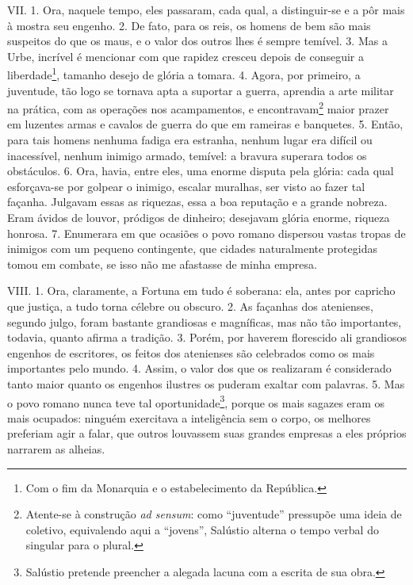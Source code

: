 VII. 1. Ora, naquele tempo, eles passaram, cada qual, a distinguir-se e a pôr
mais à mostra seu engenho. 2. De fato, para os reis, os homens de bem são mais
suspeitos do que os maus, e o valor dos outros lhes é sempre temível. 3. Mas a
Urbe, incrível é mencionar com que rapidez cresceu depois de conseguir a
liberdade\footnote{Com o fim da Monarquia e o estabelecimento da República.},
tamanho desejo de glória a tomara. 4. Agora, por primeiro, a juventude, tão
logo se tornava apta a suportar a guerra, aprendia a arte militar na prática,
com as operações nos acampamentos, e encontravam\footnote{Atente-se à
construção \emph{ad sensum}: como ``juventude'' pressupõe uma ideia de
coletivo, equivalendo aqui a ``jovens'', Salústio alterna o tempo verbal do
singular para o plural.} maior prazer em luzentes armas e cavalos de guerra do
que em rameiras e banquetes. 5. Então, para tais homens nenhuma fadiga era
estranha, nenhum lugar era difícil ou inacessível, nenhum inimigo armado,
temível: a bravura superara todos os obstáculos. 6. Ora, havia, entre eles, uma
enorme disputa pela glória: cada qual esforçava-se por golpear o inimigo,
escalar muralhas, ser visto ao fazer tal façanha. Julgavam essas as riquezas,
essa a boa reputação e a grande nobreza. Eram ávidos de louvor, pródigos de
dinheiro; desejavam glória enorme, riqueza honrosa. 7. Enumerara em que
ocasiões o povo romano dispersou vastas tropas de inimigos com um pequeno
contingente, que cidades naturalmente protegidas tomou em combate, se isso não
me afastasse de minha empresa.

VIII. 1. Ora, claramente, a Fortuna em tudo é soberana: ela, antes por capricho
que justiça, a tudo torna célebre ou obscuro. 2. As façanhas dos atenienses,
segundo julgo, foram bastante grandiosas e magníficas, mas não tão importantes,
todavia, quanto afirma a tradição. 3. Porém, por haverem florescido ali
grandiosos engenhos de escritores, os feitos dos atenienses são celebrados como
os mais importantes pelo mundo. 4. Assim, o valor dos que os realizaram é
considerado tanto maior quanto os engenhos ilustres os puderam exaltar com
palavras. 5. Mas o povo romano nunca teve tal oportunidade\footnote{Salústio
pretende preencher a alegada lacuna com a escrita de sua obra.}, porque os mais
sagazes eram os mais ocupados: ninguém exercitava a inteligência sem o corpo,
os melhores preferiam agir a falar, que outros louvassem suas grandes empresas
a eles próprios narrarem as alheias.

